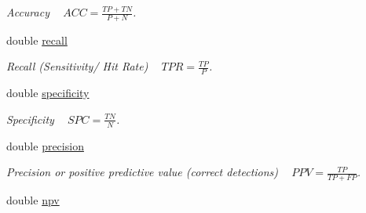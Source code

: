 \begin{DoxyCompactItemize}
\begin{DoxyCompactList}\small\item\em Accuracy ~\newline
 $ ACC = \frac{TP+TN}{P+N} $. \end{DoxyCompactList}\item 
\hypertarget{struct_vision_core_1_1_evaluation_1_1_binary_classifier_eval_result_a0fb25e19c2b2cfc018d2ef6cdf7947e3}{}double \hyperlink{struct_vision_core_1_1_evaluation_1_1_binary_classifier_eval_result_a0fb25e19c2b2cfc018d2ef6cdf7947e3}{recall}\label{struct_vision_core_1_1_evaluation_1_1_binary_classifier_eval_result_a0fb25e19c2b2cfc018d2ef6cdf7947e3}

\begin{DoxyCompactList}\small\item\em Recall (Sensitivity/ Hit Rate) ~\newline
 $ TPR = \frac{TP}{P} $. \end{DoxyCompactList}\item 
\hypertarget{struct_vision_core_1_1_evaluation_1_1_binary_classifier_eval_result_aad6585357e6c67247c6fefc19d496272}{}double \hyperlink{struct_vision_core_1_1_evaluation_1_1_binary_classifier_eval_result_aad6585357e6c67247c6fefc19d496272}{specificity}\label{struct_vision_core_1_1_evaluation_1_1_binary_classifier_eval_result_aad6585357e6c67247c6fefc19d496272}

\begin{DoxyCompactList}\small\item\em Specificity ~\newline
 $ SPC = \frac{TN}{N} $. \end{DoxyCompactList}\item 
\hypertarget{struct_vision_core_1_1_evaluation_1_1_binary_classifier_eval_result_a98ce42142601aa81694132ce8af84e8b}{}double \hyperlink{struct_vision_core_1_1_evaluation_1_1_binary_classifier_eval_result_a98ce42142601aa81694132ce8af84e8b}{precision}\label{struct_vision_core_1_1_evaluation_1_1_binary_classifier_eval_result_a98ce42142601aa81694132ce8af84e8b}

\begin{DoxyCompactList}\small\item\em Precision or positive predictive value (correct detections) ~\newline
 $ PPV = \frac{TP}{TP+FP} $. \end{DoxyCompactList}\item 
\hypertarget{struct_vision_core_1_1_evaluation_1_1_binary_classifier_eval_result_a2f35bc80bfff53daa8746f9b7cbcb3a2}{}double \hyperlink{struct_vision_core_1_1_evaluation_1_1_binary_classifier_eval_result_a2f35bc80bfff53daa8746f9b7cbcb3a2}{npv}\label{struct_vision_core_1_1_evaluation_1_1_binary_classifier_eval_result_a2f35bc80bfff53daa8746f9b7cbcb3a2}


\end{DoxyCompactItemize}

